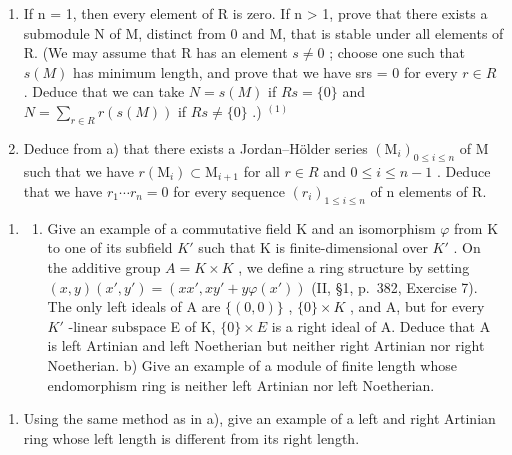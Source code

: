 \begin{enumerate}
\def\labelenumi{\alph{enumi})}
\item
  If n = 1, then every element of R is zero. If n \textgreater{} 1, prove that there exists a submodule N of M, distinct from 0 and M, that is stable under all elements of R. (We may assume that R has an element \(s \neq 0\) ; choose one such that \(s(M)\) has minimum length, and prove that we have srs = 0 for every \(r \in R\) . Deduce that we can take \(N = s(M)\) if \(Rs = \{0\}\) and \(N = \sum_{r \in R} r(s(M))\) if \(Rs \neq \{0\}\) .) \(^{(1)}\)
\item
  Deduce from a) that there exists a Jordan--Hölder series \((\mathrm{M}_{i})_{0\leqslant i\leqslant n}\) of M such that we have \(r(\mathrm{M}_{i})\subset\mathrm{M}_{i+1}\) for all \(r\in R\) and \(0\leqslant i\leqslant n-1\) . Deduce that we have \(r_{1}\cdots r_{n}=0\) for every sequence \((r_{i})_{1\leqslant i\leqslant n}\) of n elements of R.
\end{enumerate}

\begin{enumerate}
\def\labelenumi{\arabic{enumi})}
\setcounter{enumi}{2}
\tightlist
\item
  \begin{enumerate}
  \def\labelenumii{\alph{enumii})}
  \tightlist
  \item
    Give an example of a commutative field K and an isomorphism \(\varphi\) from K to one of its subfield \(K'\) such that K is finite-dimensional over \(K'\) . On the additive group \(A = K \times K\) , we define a ring structure by setting \((x, y)(x', y') = (xx', xy' + y\varphi(x'))\) (II, §1, p.~382, Exercise 7). The only left ideals of A are \(\{(0, 0)\}\) , \(\{0\} \times K\) , and A, but for every \(K'\) -linear subspace E of K, \(\{0\} \times E\) is a right ideal of A. Deduce that A is left Artinian and left Noetherian but neither right Artinian nor right Noetherian. b) Give an example of a module of finite length whose endomorphism ring is neither left Artinian nor left Noetherian.
  \end{enumerate}
\end{enumerate}

\begin{enumerate}
\def\labelenumi{\alph{enumi})}
\setcounter{enumi}{2}
\tightlist
\item
  Using the same method as in a), give an example of a left and right Artinian ring whose left length is different from its right length.
\end{enumerate}

